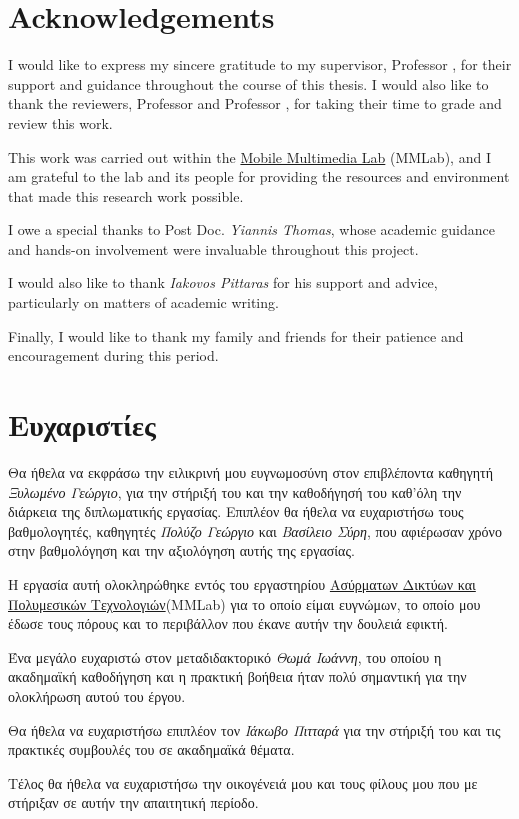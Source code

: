 %
\chapter*{Acknowledgements}
\label{sec:acknowledgements}
\vspace*{-10mm}



I would like to express my sincere gratitude to my supervisor, Professor \emph{\thesisSupervisor}, for their support and guidance throughout the course of this thesis.
I would also like to thank the reviewers, Professor \emph{\thesisReviewerOne} and Professor \emph{\thesisReviewerTwo} , for taking their time to grade and review this work.

This work was carried out within the \href{https://mm.aueb.gr/}{Mobile Multimedia Lab} (MMLab), and I am grateful to the lab and its people for providing the resources and environment that made this research work possible.

I owe a special thanks to Post Doc. \emph{Yiannis Thomas}, whose academic guidance and hands-on involvement were invaluable throughout this project.

I would also like to thank \emph{Iakovos Pittaras} for his support and advice, particularly on matters of academic writing.

Finally, I would like to thank my family and friends for their patience and encouragement during this period.

\chapter*{Ευχαριστίες}
\label{sec:acknowledgements_greek}

Θα ήθελα να εκφράσω την ειλικρινή μου ευγνωμοσύνη στον επιβλέποντα καθηγητή \emph{Ξυλωμένο Γεώργιο}, για την στήριξή του και την καθοδήγησή του καθ'όλη την διάρκεια της διπλωματικής εργασίας.
Επιπλέον θα ήθελα να ευχαριστήσω τους βαθμολογητές, καθηγητές \emph{Πολύζο Γεώργιο} και \emph{Βασίλειο Σύρη}, που αφιέρωσαν χρόνο στην βαθμολόγηση και την αξιολόγηση αυτής της εργασίας.

Η εργασία αυτή ολοκληρώθηκε εντός του εργαστηρίου \href{https://mm.aueb.gr/}{Ασύρματων Δικτύων και Πολυμεσικών Τεχνολογιών}(MMLab) για το οποίο είμαι ευγνώμων, το οποίο μου έδωσε τους πόρους και το περιβάλλον που έκανε αυτήν την δουλειά εφικτή.

Ένα μεγάλο ευχαριστώ στον μεταδιδακτορικό \emph{Θωμά Ιωάννη}, του οποίου η ακαδημαϊκή καθοδήγηση και η πρακτική βοήθεια ήταν πολύ σημαντική για την ολοκλήρωση αυτού του έργου.

Θα ήθελα να ευχαριστήσω επιπλέον τον \emph{Ιάκωβο Πιτταρά} για την στήριξή του και τις πρακτικές συμβουλές του σε ακαδημαϊκά θέματα.

Τέλος θα ήθελα να ευχαριστήσω την οικογένειά μου και τους φίλους μου που με στήριξαν σε αυτήν την απαιτητική περίοδο.
